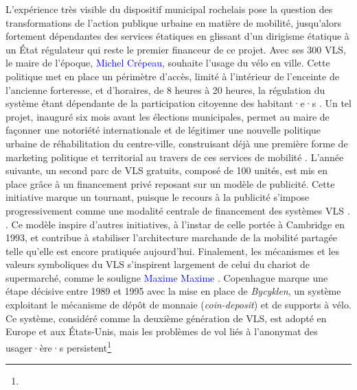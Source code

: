 \begin{refsegment}
{    L'expérience très visible du dispositif municipal rochelais pose la question des transformations de l'action publique urbaine en matière de mobilité, jusqu'alors fortement dépendantes des services étatiques en glissant d'un dirigisme étatique à un État régulateur qui reste le premier financeur de ce projet. Avec ses 300 \acrshort{VLS}, le maire de l'époque, \textcolor{blue}{Michel Crépeau}, souhaite  l'usage du vélo en ville. Cette politique met en place un périmètre d'accès, limité à l'intérieur de l'enceinte de l'ancienne forteresse, et d'horaires, de 8 heures à 20 heures, la régulation du système étant dépendante de la participation citoyenne des habitant·e·s \textcolor{blue}{\autocite[31]{hure_mobilites_2019}}. Un tel projet, inauguré six mois avant les élections municipales, permet au maire de façonner une notoriété internationale et de légitimer une nouvelle politique urbaine de réhabilitation du centre-ville, construisant déjà une première forme de marketing politique et territorial au travers de ces services de mobilité \textcolor{blue}{\autocite[31]{hure_mobilites_2019}}. L’année suivante, un second parc de \acrshort{VLS} gratuits, composé de 100 unités, est mis en place grâce à un financement privé reposant sur un modèle de publicité. Cette initiative marque un tournant, puisque le recours à la publicité s’impose progressivement comme une modalité centrale de financement des systèmes \acrshort{VLS} \textcolor{blue}{\autocite[32-35]{fleury_mobilites_2022}}.
}. Ce modèle inspire d’autres initiatives, à l’instar de celle portée à Cambridge en 1993, et contribue à stabiliser l’architecture marchande de la mobilité partagée telle qu’elle est encore pratiquée aujourd’hui. Finalement, les mécanismes et les valeurs symboliques du \acrshort{VLS} s’inspirent largement de celui du chariot de supermarché, comme le souligne \textcolor{blue}{Maxime} \textcolor{blue}{Maxime} \textcolor{blue}{\textcite[40]{hure_mobilites_2019}}. Copenhague marque une étape décisive entre 1989 et 1995 avec la mise en place de \textsl{Bycyklen}, un système exploitant le mécanisme de dépôt de monnaie (\textsl{coin-deposit}) et de supports à vélo. Ce système, considéré comme la deuxième génération de \acrshort{VLS}, est adopté en Europe et aux États-Unis, mais les problèmes de vol liés à l’anonymat des usager·ère·s persistent\footnote{
}
\end{refsegment}
